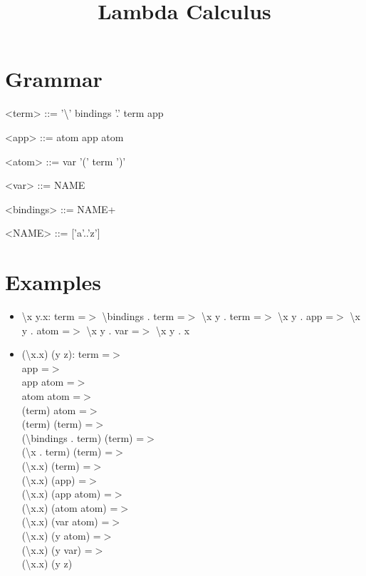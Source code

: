 \documentclass[12pt]{article}
\title{Lambda Calculus}
\begin{document}
\maketitle

\section{Grammar}
\begin{grammar}
    <term> ::= '\textbackslash' bindings '.' term
    \alt app

    <app> ::= atom
    \alt app atom

    <atom> ::= var
    \alt '(' term ')'

    <var> ::= NAME

    <bindings> ::= NAME+

    <NAME> ::= ['a'..'z']
\end{grammar}


\section{Examples}

\begin{itemize}
    \item \textbackslash x y.x:
term =$>$ \textbackslash bindings . term =$>$ \textbackslash x y . term =$>$ \textbackslash x y . app =$>$ \textbackslash x y . atom =$>$ \textbackslash x y . var =$>$ \textbackslash x y . x
    \item (\textbackslash x.x) (y z): 
term =$>$\\
app =$>$\\
app atom =$>$\\
atom atom =$>$\\
(term) atom =$>$\\
(term) (term) =$>$\\
(\textbackslash bindings . term) (term) =$>$\\
(\textbackslash x . term) (term) =$>$\\
(\textbackslash x.x) (term) =$>$\\
(\textbackslash x.x) (app) =$>$\\
(\textbackslash x.x) (app atom) =$>$\\
(\textbackslash x.x) (atom atom) =$>$\\
(\textbackslash x.x) (var atom) =$>$\\
(\textbackslash x.x) (y atom) =$>$\\
(\textbackslash x.x) (y var) =$>$\\
(\textbackslash x.x) (y z)
    
\end{itemize}
\end{document}
